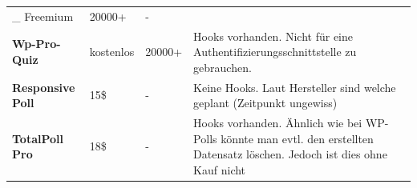 \begin{longtable}[c]{@{}llll@{}}
\begin{minipage}[t]{0.14\columnwidth}
\_ Freemium
\strut\end{minipage} &
\begin{minipage}[t]{0.14\columnwidth}\raggedright\strut
20000+
\strut\end{minipage} &
\begin{minipage}[t]{0.28\columnwidth}\raggedright\strut
-
\strut\end{minipage}\tabularnewline
\begin{minipage}[t]{0.33\columnwidth}\raggedright\strut
\textbf{Wp-Pro-Quiz}
\strut\end{minipage} &
\begin{minipage}[t]{0.14\columnwidth}\raggedright\strut
kostenlos
\strut\end{minipage} &
\begin{minipage}[t]{0.14\columnwidth}\raggedright\strut
20000+
\strut\end{minipage} &
\begin{minipage}[t]{0.28\columnwidth}\raggedright\strut
Hooks vorhanden. Nicht für eine Authentifizierungsschnittstelle zu
gebrauchen.
\strut\end{minipage}\tabularnewline
\begin{minipage}[t]{0.33\columnwidth}\raggedright\strut
\textbf{Responsive Poll}
\strut\end{minipage} &
\begin{minipage}[t]{0.14\columnwidth}\raggedright\strut
15\$
\strut\end{minipage} &
\begin{minipage}[t]{0.14\columnwidth}\raggedright\strut
-
\strut\end{minipage} &
\begin{minipage}[t]{0.28\columnwidth}\raggedright\strut
Keine Hooks. Laut Hersteller sind welche geplant (Zeitpunkt ungewiss)
\strut\end{minipage}\tabularnewline
\begin{minipage}[t]{0.33\columnwidth}\raggedright\strut
\textbf{TotalPoll Pro}
\strut\end{minipage} &
\begin{minipage}[t]{0.14\columnwidth}\raggedright\strut
18\$
\strut\end{minipage} &
\begin{minipage}[t]{0.14\columnwidth}\raggedright\strut
-
\strut\end{minipage} &
\begin{minipage}[t]{0.28\columnwidth}\raggedright\strut
Hooks vorhanden. Ähnlich wie bei WP-Polls könnte man evtl. den
erstellten Datensatz löschen. Jedoch ist dies ohne Kauf nicht

\end{minipage}
\end{longtable}
